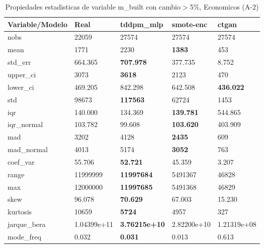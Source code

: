 \begin{table}[H]
\centering
\fontsize{8}{14}\selectfont
\caption{Propiedades estadisticas de variable m\_built con cambio\ensuremath{>}5\%, Economicos (A-2)}
\label{table-stats-economicos-a-2-m_built-short}
\begin{tabular}{|l|m{10em}|m{10em}|m{10em}|m{10em}|}
\hline
 \rowcolor[gray]{0.8}
Variable/Modelo & Real & tddpm\_mlp & smote-enc & ctgan \\
\hline nobs & 22059 & 27574 & 27574 & 27574 \\
\hline mean & 1771 & 2230 & \bfseries 1383 & \cellcolor[rgb]{0.9, 0.54, 0.52} 453 \\
\hline std\_err & 664.365 & \bfseries 707.978 & 377.735 & \cellcolor[rgb]{0.9, 0.54, 0.52} 8.752 \\
\hline upper\_ci & 3073 & \bfseries 3618 & 2123 & \cellcolor[rgb]{0.9, 0.54, 0.52} 470 \\
\hline lower\_ci & 469.205 & \cellcolor[rgb]{0.9, 0.54, 0.52} 842.298 & 642.508 & \bfseries 436.022 \\
\hline std & 98673 & \bfseries 117563 & 62724 & \cellcolor[rgb]{0.9, 0.54, 0.52} 1453 \\
\hline iqr & 140.000 & 134.369 & \bfseries 139.781 & \cellcolor[rgb]{0.9, 0.54, 0.52} 544.865 \\
\hline iqr\_normal & 103.782 & 99.608 & \bfseries 103.620 & \cellcolor[rgb]{0.9, 0.54, 0.52} 403.909 \\
\hline mad & 3202 & 4128 & \bfseries 2435 & \cellcolor[rgb]{0.9, 0.54, 0.52} 609 \\
\hline mad\_normal & 4013 & 5174 & \bfseries 3052 & \cellcolor[rgb]{0.9, 0.54, 0.52} 763 \\
\hline coef\_var & 55.706 & \bfseries 52.721 & 45.359 & \cellcolor[rgb]{0.9, 0.54, 0.52} 3.207 \\
\hline range & 11999999 & \bfseries 11997684 & 5491367 & \cellcolor[rgb]{0.9, 0.54, 0.52} 46828 \\
\hline max & 12000000 & \bfseries 11997685 & 5491368 & \cellcolor[rgb]{0.9, 0.54, 0.52} 46829 \\
\hline skew & 96.078 & \bfseries 70.629 & 67.003 & \cellcolor[rgb]{0.9, 0.54, 0.52} 15.230 \\
\hline kurtosis & 10659 & \bfseries 5724 & 4957 & \cellcolor[rgb]{0.9, 0.54, 0.52} 327 \\
\hline jarque\_bera & 1.04399e+11 & \bfseries 3.76215e+10 & 2.82200e+10 & \cellcolor[rgb]{0.9, 0.54, 0.52} 1.21319e+08 \\
\hline mode\_freq & 0.032 & \bfseries 0.031 & 0.013 & \cellcolor[rgb]{0.9, 0.54, 0.52} 0.613 \\

\end{tabular}
\end{table}
